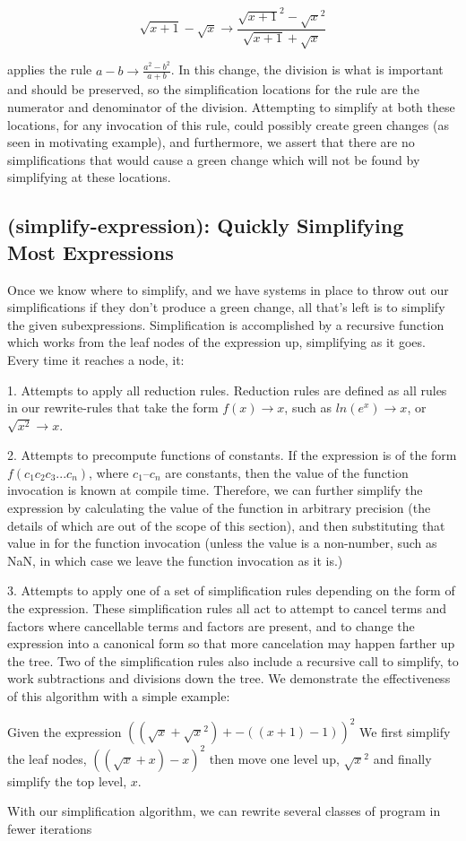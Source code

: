 \documentclass{article}
\newcommand{\lnexp}[1]{ln\left(e^{#1}\right)}
\newcommand{\sqrsqrt}[1]{\sqrt{#1}^2}
\begin{document}
\[\sqrt{x + 1} - \sqrt{x} \to \frac{\sqrsqrt{x + 1} - \sqrsqrt{x}}{\sqrt{x + 1} + \sqrt{x}}\]

applies the rule 
$a - b \to  \frac{a^2 - b^2}{a + b}$. 
In this change, 
the division is what is important 
and should be preserved, 
so the simplification locations 
for the rule are the numerator 
and denominator of the division. 
Attempting to simplify at both these locations, 
for any invocation of this rule, 
could possibly create green changes 
(as seen in motivating example), 
and furthermore, 
we assert that there are no simplifications 
that would cause a green change 
which will not be found 
by simplifying at these locations.

\subsection{(simplify-expression): Quickly Simplifying Most Expressions}

Once we know where to simplify, 
and we have systems in place 
to throw out our simplifications 
if they don't produce a green change, 
all that's left is to simplify the given subexpressions. 
Simplification is accomplished 
by a recursive function 
which works from the leaf nodes 
of the expression up, 
simplifying as it goes. 
Every time it reaches a node, it:

1. Attempts to apply all reduction rules. 
Reduction rules are defined as all rules 
in our rewrite-rules 
that take the form $f(x) \to x$, 
such as $\lnexp{x} \to x$, 
or $\sqrt{x^2} \to x$.

2. Attempts to precompute functions of constants. 
If the expression 
is of the form $f(c_1 c_2 c_3... c_n)$, 
where $c_1$--$c_n$ are constants, 
then the value of the function invocation 
is known at compile time. 
Therefore, we can further simplify the expression 
by calculating the value of the function 
in arbitrary precision 
(the details of which are out of the scope of this section), 
and then substituting that value 
in for the function invocation 
(unless the value is a non-number, 
such as NaN, 
in which case we leave the function invocation 
as it is.)

3. Attempts to apply one 
of a set of simplification rules 
depending on the form of the expression. 
These simplification rules 
all act to attempt to cancel terms and factors 
where cancellable terms and factors are present, 
and to change the expression into a canonical form 
so that more cancelation may happen 
farther up the tree. 
Two of the simplification rules 
also include a recursive call to simplify, 
to work subtractions and divisions down the tree.
We demonstrate the effectiveness of this algorithm 
with a simple example:

Given the expression
$((\sqrt{x} + \sqrsqrt{x}) + -((x + 1) - 1))^2$
We first simplify the leaf nodes,
$((\sqrt{x} + x) -x)^2$
then move one level up, 
$\sqrt{x}^2$
and finally simplify the top level,
$x$.

With our simplification algorithm, 
we can rewrite several classes of program
in fewer iterations
\end{document}
